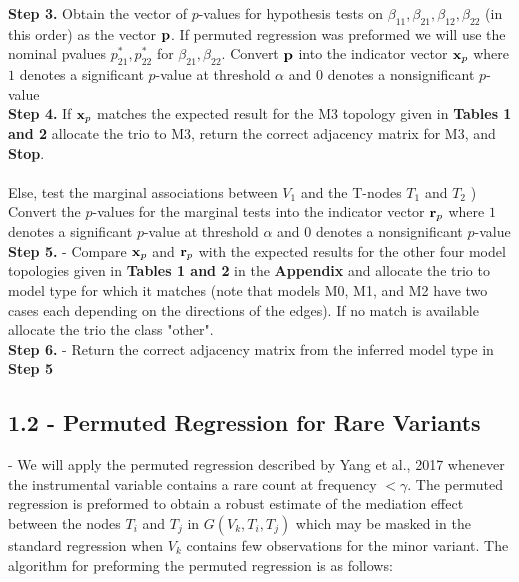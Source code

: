 \documentclass[12pt]{report}
\begin{document}
\noindent \textbf{Step 3.} Obtain the vector of $p$-values for hypothesis tests on $\beta_{11}, \beta_{21}, \beta_{12}, \beta_{22}$ (in this order) as the vector $\bf {p}$. If permuted regression was preformed we will use the nominal pvalues $p^{\ast}_{21}, p^{\ast}_{22}$ for $\beta_{21}, \beta_{22}$. Convert $\bf {p}$ into the indicator vector ${\bf x}_p$ where $1$ denotes a significant $p$-value at threshold $\alpha$ and $0$ denotes a nonsignificant $p$-value \\


\noindent \textbf{Step 4.} If ${\bf x}_p$ matches the expected result for the M3 topology given in \textbf{Tables 1 and 2} allocate the trio to M3, return the correct adjacency matrix for M3, and \textbf{Stop}. \\
\\
Else, test the marginal associations between $V_1$ and the T-nodes $T_1$ and $T_2$ ) Convert the $p$-values for the marginal tests into the indicator vector ${\bf r}_p$  where $1$ denotes a significant $p$-value at threshold $\alpha$ and $0$ denotes a nonsignificant $p$-value \\


\noindent\textbf{Step 5.} - Compare ${\bf x}_p$ and ${\bf r}_p$ with the expected results for the other four model topologies given in \textbf{Tables 1 and 2} in the \textbf{Appendix} and allocate the trio to model type for which it matches (note that models M0, M1, and M2 have two cases each depending on the directions of the edges). If no match is available allocate the trio the class "other". \\

\noindent\textbf{Step 6.} - Return the correct adjacency matrix from the inferred model type in \textbf{Step 5}


\subsection*{1.2 - Permuted Regression for Rare Variants} - We will apply the permuted regression described by Yang et al., 2017 whenever the instrumental variable contains a rare count at frequency $< \gamma$. The permuted regression is preformed to obtain a robust estimate of the mediation effect between the nodes $T_i$ and $T_j$ in $G(V_k, T_i, T_j)$ which may be masked in the standard regression when $V_k$ contains few observations for the minor variant. The algorithm for preforming the permuted regression is as follows:\\
\end{document}

